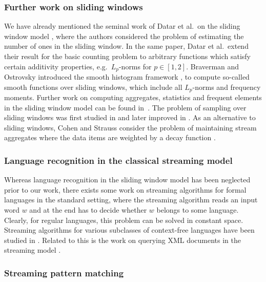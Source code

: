 \documentclass{theoretics}
\begin{document}
\subsubsection{Further work on sliding windows} \label{sec-further-SW}

We have already mentioned the seminal work of Datar et al.~on the sliding window model
\cite{DatarGIM02}, where the authors considered the problem of estimating the number of ones in the sliding window.
In the same paper, Datar et al.~extend their result for the basic counting problem 
to arbitrary functions which satisfy certain additivity properties,
e.g.~$L_p$-norms for $p \in [1,2]$.
Braverman and Ostrovsky introduced the smooth histogram framework \cite{BravermanO07},
to compute so-called smooth functions over sliding windows, which include all $L_p$-norms and frequency moments.
Further work on computing aggregates, statistics and frequent elements in the sliding window model can be found
in~\cite{ArasuM04,BabcockDMO03,Ben-BasatEF18,Ben-BasatEFK16,BravermanGLWZ18,DatarM02,FeigenbaumKZ04,GibbonsT04,GolabDDLM03}.
The problem of sampling over sliding windows was first studied in \cite{BabcockDM02}
and later improved in \cite{BravermanOZ12}.
As an alternative to sliding windows, Cohen and Strauss consider the problem of maintaining stream aggregates
where the data items are weighted by a decay function \cite{CohenS06}.

\subsubsection{Language recognition in the classical streaming model} \label{sec-language-recog}
 
Whereas language recognition in the sliding window model has been neglected prior to our work, there exists
some work on streaming algorithms for formal languages in the standard setting, where the streaming algorithm
reads an input word $w$ and at the end has to decide whether $w$ belongs to some language. Clearly, for regular
languages, this problem can be solved in constant space. Streaming algorithms for various subclasses of context-free
languages have been studied in \cite{BabuLRV13,FrancoisMRS16,JN14,KrebsLS11,MagniezMN14}. Related to this is the work on querying XML documents
in the streaming model \cite{BarloyMP21,KonradM13,SegoufinV02}.

\subsubsection{Streaming pattern matching} 
\end{document}
